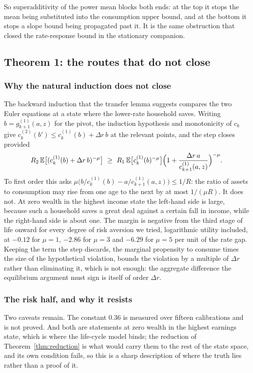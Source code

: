So superadditivity of the power mean blocks both ends: at the top it stops the mean being
substituted into the consumption upper bound, and at the bottom it stops a slope bound being
propagated past it. It is the same obstruction that closed the rate-response bound in the
stationary companion.


\subsection*{Theorem 1: the routes that do not close}

\subsubsection*{Why the natural induction does not close}

The backward induction that the transfer lemma suggests compares the two Euler equations at a
state where the lower-rate household saves. Writing $b=g^{(1)}_{k+1}(a,z)$ for the pivot, the
induction hypothesis and monotonicity of $c_k$ give
$c^{(2)}_k(b')\le c^{(1)}_k(b)+\Delta r\,b$ at the relevant points, and the step closes provided
\[
  R_2\,\mathbb{E}\bigl[(c^{(1)}_k(b)+\Delta r\,b)^{-\mu}\bigr]\ \ge\
  R_1\,\mathbb{E}\bigl[c^{(1)}_k(b)^{-\mu}\bigr]\Bigl(1+\frac{\Delta r\,a}{c^{(1)}_{k+1}(a,z)}\Bigr)^{-\mu}.
\]
To first order this asks $\mu\bigl(b/c^{(1)}_k(b)-a/c^{(1)}_{k+1}(a,z)\bigr)\le1/R$: the ratio of
assets to consumption may rise from one age to the next by at most $1/(\mu R)$. It does not. At
zero wealth in the highest income state the left-hand side is large, because such a household
saves a great deal against a certain fall in income, while the right-hand side is about one. The
margin is negative from the third stage of life onward for every degree of risk aversion we tried,
logarithmic utility included, at $-0.12$ for $\mu=1$, $-2.86$ for $\mu=3$ and $-6.29$ for $\mu=5$
per unit of the rate gap. Keeping the term the step discards, the marginal propensity to consume
times the size of the hypothetical violation, bounds the violation by a multiple of $\Delta r$
rather than eliminating it, which is not enough: the aggregate difference the equilibrium argument
must sign is itself of order $\Delta r$.

\subsubsection*{The risk half, and why it resists}

Two caveats remain. The constant $0.36$ is measured over fifteen calibrations and
is not proved. And both are statements at zero wealth in the highest earnings state, which is
where the life-cycle model binds; the reduction of Theorem~\ref{thm:reduction} is what would carry
them to the rest of the state space, and its own condition fails, so this is a sharp description
of where the truth lies rather than a proof of it.

